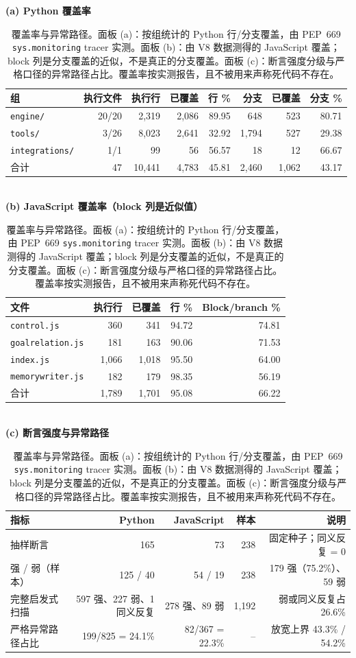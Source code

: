 \begin{table}[t]
\centering
\caption{覆盖率与异常路径。面板 (a)：按组统计的 Python 行/分支覆盖，由 PEP~669 \texttt{sys.monitoring} tracer 实测。面板 (b)：由 V8 数据测得的 JavaScript 覆盖；block 列是分支覆盖的近似，不是真正的分支覆盖。面板 (c)：断言强度分级与严格口径的异常路径占比。覆盖率按实测报告，且不被用来声称死代码不存在。}
\small
\textbf{(a) Python 覆盖率}\\[2pt]
\begin{tabular}{lrrrrrrr}
\toprule
组 & 执行文件 & 执行行 & 已覆盖 & 行 \% & 分支 & 已覆盖 & 分支 \% \\
\midrule
\texttt{engine/}        & 20/20 & 2{,}319 & 2{,}086 & 89.95 & 648  & 523  & 80.71 \\
\texttt{tools/}         & 3/26  & 8{,}023 & 2{,}641 & 32.92 & 1{,}794 & 527 & 29.38 \\
\texttt{integrations/}  & 1/1   &    99 &    56 & 56.57 & 18   & 12   & 66.67 \\
合计                   & 47    & 10{,}441 & 4{,}783 & 45.81 & 2{,}460 & 1{,}062 & 43.17 \\
\bottomrule
\end{tabular}\\[6pt]
\textbf{(b) JavaScript 覆盖率（block 列是近似值）}\\[2pt]
\begin{tabular}{lrrrr}
\toprule
文件 & 执行行 & 已覆盖 & 行 \% & Block/branch \% \\
\midrule
\texttt{control.js}      &   360 &   341 & 94.72 & 74.81 \\
\texttt{goalrelation.js} &   181 &   163 & 90.06 & 71.53 \\
\texttt{index.js}        & 1{,}066 & 1{,}018 & 95.50 & 64.00 \\
\texttt{memorywriter.js} &   182 &   179 & 98.35 & 56.19 \\
合计                    & 1{,}789 & 1{,}701 & 95.08 & 66.22 \\
\bottomrule
\end{tabular}\\[6pt]
\textbf{(c) 断言强度与异常路径}\\[2pt]
\begin{tabular}{lrrrr}
\toprule
指标 & Python & JavaScript & 样本 & 说明 \\
\midrule
抽样断言            & 165 &  73 & 238 & 固定种子；同义反复 = 0 \\
强 / 弱（样本）     & 125 / 40 & 54 / 19 & 238 & 179 强（75.2\%）、59 弱 \\
完整启发式扫描      & 597 强、227 弱、1 同义反复 & 278 强、89 弱 & 1{,}192 & 弱或同义反复占 26.6\% \\
严格异常路径占比    & 199/825 = 24.1\% & 82/367 = 22.3\% & -- & 放宽上界 43.3\% / 54.2\% \\
\bottomrule
\end{tabular}
\end{table}

